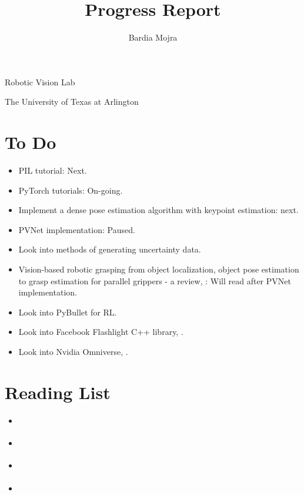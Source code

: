 \documentclass[11pt]{article}
\title{Progress Report}
\author{Bardia Mojra}
\begin{document}
\maketitle
\thispagestyle{empty}

\bigskip
\bigskip
\begin{center}
      Robotic Vision Lab
\end{center}

\begin{center}
      The University of Texas at Arlington
\end{center}

\newpage

\section{To Do}
\begin{itemize}
      \item PIL tutorial: Next.
      \item PyTorch tutorials: On-going.
      \item Implement a dense pose estimation algorithm with keypoint estimation:
      next.
      \item PVNet implementation: Paused.
      \item Look into methods of generating uncertainty data.
      \item Vision-based robotic grasping from object localization, object pose
      estimation to grasp estimation for parallel grippers - a review,
      \cite{du2020vision}: Will read after PVNet implementation.
      \item Look into PyBullet for RL.
      \item Look into Facebook Flashlight C++ library, \cite{flashlig35:online}.
      \item Look into Nvidia Omniverse, \cite{NVIDIAOm1:online}.
\end{itemize}

\section{Reading List}
\begin{itemize}
      \item \cite{roadmap251:online}
      \item \cite{ferraz2014leveraging}
      \item \cite{he2015deep}
      \item \cite{du2020vision}
\end{itemize}
\end{document}
